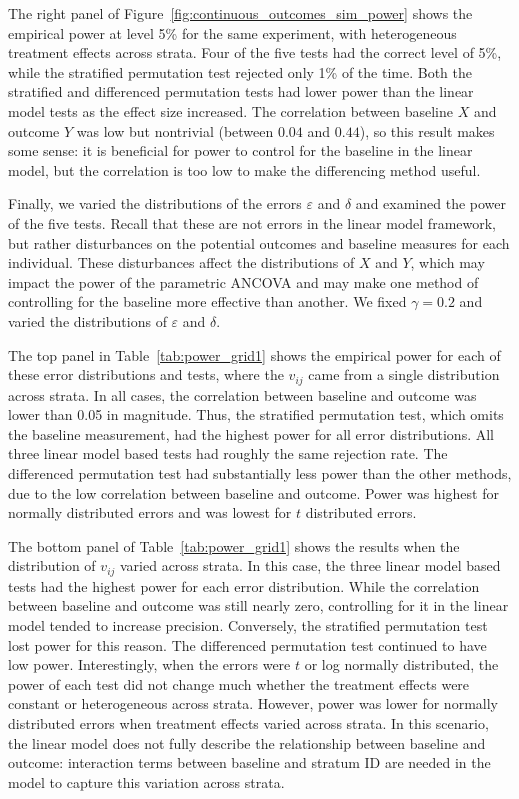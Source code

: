 \documentclass[12pt]{article}
\begin{document}
The right panel of Figure~\ref{fig:continuous_outcomes_sim_power} shows the empirical power at level 5\% for the same experiment, with heterogeneous treatment effects across strata.
Four of the five tests had the correct level of 5\%, while the stratified permutation test rejected only 1\% of the time.
Both the stratified and differenced permutation tests had lower power than the linear model tests as the effect size increased.
The correlation between baseline $X$ and outcome $Y$ was low but nontrivial (between $0.04$ and $0.44$), so this result makes some sense:
it is beneficial for power to control for the baseline in the linear model, but the correlation is too low to make the differencing method useful.

Finally, we varied the distributions of the errors $\varepsilon$ and $\delta$ and examined the power of the five tests.
Recall that these are not errors in the linear model framework, but rather disturbances on the potential outcomes and baseline measures for each individual.
These disturbances affect the distributions of $X$ and $Y$, which may impact the power of the parametric ANCOVA and may make one method of controlling for the baseline more effective than another.
We fixed $\gamma=0.2$ and varied the distributions of $\varepsilon$ and $\delta$.

The top panel in Table~\ref{tab:power_grid1} shows the empirical power for each of these error distributions and tests, where the $v_{ij}$ came from a single distribution across strata.
In all cases, the correlation between baseline and outcome was lower than 0.05 in magnitude.
Thus, the stratified permutation test, which omits the baseline measurement, had the highest power for all error distributions.
All three linear model based tests had roughly the same rejection rate.
The differenced permutation test had substantially less power than the other methods, due to the low correlation between baseline and outcome.
Power was highest for normally distributed errors and was lowest for $t$ distributed errors.

The bottom panel of Table~\ref{tab:power_grid1} shows the results when the distribution of $v_{ij}$ varied across strata.
In this case, the three linear model based tests had the highest power for each error distribution.
While the correlation between baseline and outcome was still nearly zero, controlling for it in the linear model tended to increase precision.
Conversely, the stratified permutation test lost power for this reason.
The differenced permutation test continued to have low power.
Interestingly, when the errors were $t$ or log normally distributed, the power of each test did not change much whether the treatment effects were constant or heterogeneous across strata.
However, power was lower for normally distributed errors when treatment effects varied across strata.
In this scenario, the linear model does not fully describe the relationship between baseline and outcome: 
interaction terms between baseline and stratum ID are needed in the model to capture this variation across strata.
\end{document}
